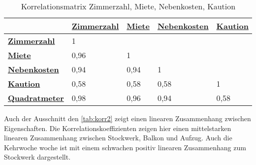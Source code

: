 \useunder{\uline}{\ul}{}
\begin{table}[h]
    \begin{center}
        \begin{tabular}{|l|l|l|l|l|}
            \hline
            {\ul \textbf{}}             & {\ul \textbf{Zimmerzahl}} & {\ul \textbf{Miete}} & {\ul \textbf{Nebenkosten}} & {\ul \textbf{Kaution}} \\ \hline
            {\ul \textbf{Zimmerzahl}}   & 1                         &                      &                            &                        \\ \hline
            {\ul \textbf{Miete}}        & 0,96                      & 1                    &                            &                        \\ \hline
            {\ul \textbf{Nebenkosten}}  & 0,94                      & 0,94                 & 1                          &                        \\ \hline
            {\ul \textbf{Kaution}}      & 0,58                      & 0,58                 & 0,58                       & 1                      \\ \hline
            {\ul \textbf{Quadratmeter}} & 0,98                      & 0,96                 & 0,94                       & 0,58                   \\ \hline
        \end{tabular}
        \caption{Korrelationsmatrix Zimmerzahl, Miete, Nebenkosten, Kaution}
        \label{tab:korr1}
    \end{center}
\end{table}

Auch der Ausschnitt den \autoref{tab:korr2} zeigt einen linearen Zusammenhang zwischen Eigenschaften. Die Korrelationskoeffizienten 
zeigen hier einen mittelstarken linearen Zusammenhang zwischen Stockwerk, Balkon und Aufzug. 
Auch die Kehrwoche woche ist mit einem schwachen positiv linearen Zusammenhang zum Stockwerk dargestellt. 

